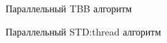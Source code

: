 \documentclass{report}
\begin{document}
\begin{figure}[H]
\caption{Параллельный TBB алгоритм}
\end{figure}
\begin{figure}[H]
\caption{Параллельный STD:thread алгоритм}
\end{figure}
\end{document}
